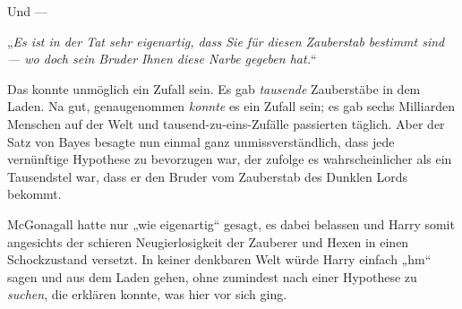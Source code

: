 Und —

„\emph{Es ist in der Tat sehr eigenartig, dass Sie für diesen Zauberstab bestimmt sind — wo doch sein Bruder Ihnen diese Narbe gegeben hat.}“

Das konnte unmöglich ein Zufall sein. Es gab \emph{tausende} Zauberstäbe in dem Laden. Na gut, genaugenommen \emph{konnte} es ein Zufall sein; es gab sechs Milliarden Menschen auf der Welt und tausend-zu-eins-Zufälle passierten täglich. Aber der Satz von Bayes besagte nun einmal ganz unmissverständlich, dass jede vernünftige Hypothese zu bevorzugen war, der zufolge es wahrscheinlicher als ein Tausendstel war, dass er den Bruder vom Zauberstab des Dunklen Lords bekommt.

McGonagall hatte nur „wie eigenartig“ gesagt, es dabei belassen und Harry somit angesichts der schieren Neugierlosigkeit der Zauberer und Hexen in einen Schockzustand versetzt. In keiner denkbaren Welt würde Harry einfach „hm“ sagen und aus dem Laden gehen, ohne zumindest nach einer Hypothese zu \emph{suchen}, die erklären konnte, was hier vor sich ging.


